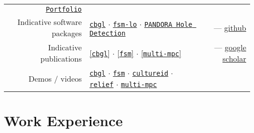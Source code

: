 \documentclass[a4paper,10pt,twoside]{article}
\begin{document}
\vspace{+0.1cm}
\begin{tabular}{rlr}
  \href{https://docs.google.com/viewer?url=https://raw.githubusercontent.com/li9i/portfolio/master/portfolio.pdf}{\texttt{Portfolio}} &&\\

  Indicative software packages &
  \href{https://github.com/li9i/cbgl}{\texttt{cbgl}} $\cdot$
  \href{https://github.com/li9i/fsm-lo}{\texttt{fsm-lo}} $\cdot$
  \href{https://github.com/li9i/pandora\_vision\_2014/tree/hydro-devel/pandora\_vision\_hole\_detector}{\texttt{PANDORA Hole Detection}} \hspace{1em} & --- \href{https://github.com/li9i}{github}\\

  Indicative publications &
  \href{https://ieeexplore.ieee.org/abstract/document/10802235}{[\texttt{cbgl}]} $\cdot$
  \href{https://ieeexplore.ieee.org/abstract/document/9981228}{[\texttt{fsm}]} $\cdot$
  \href{https://www.tandfonline.com/doi/full/10.1080/00207179.2018.1514129}{[\texttt{multi-mpc}]} \hspace{4.4em} & --- \href{https://scholar.google.com/citations?hl=en&user=9_hI4hMAAAAJ&view_op=list_works&sortby=pubdate}{google scholar}\\

  Demos / videos & \href{https://www.youtube.com/watch?v=xaDKjI0WkDc}{\texttt{cbgl}} $\cdot$ \href{https://www.youtube.com/watch?v=hB4qsHCEXGI}{\texttt{fsm}} $\cdot$ \href{https://cultureid.web.auth.gr/?page\_id=200&lang=en}{\texttt{cultureid}} $\cdot$ \href{https://relief.web.auth.gr/}{\texttt{relief}} $\cdot$ \href{https://www.youtube.com/watch?v=937OZez1iN8}{\texttt{multi-mpc}} &
\end{tabular}

\section{Work Experience}
\end{document}
